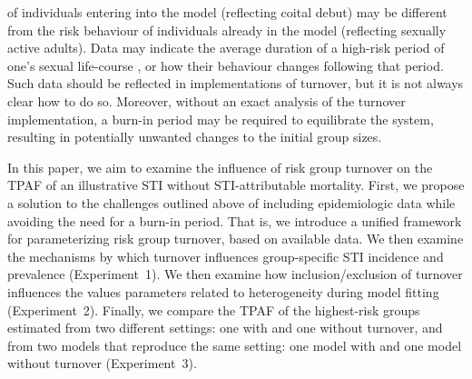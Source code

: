 of individuals entering into the model (reflecting coital debut)
may be different from the risk behaviour
of individuals already in the model (reflecting sexually active adults). %
Data may indicate the average duration
of a high-risk period of one's sexual life-course \citep{Watts2010}, %
or how their behaviour changes following that period. %
Such data should be reflected in implementations of turnover,
but it is not always clear how to do so.
Moreover, without an exact analysis of the turnover implementation,
a burn-in period may be required to equilibrate the system,
resulting in potentially unwanted changes to the initial group sizes.
\par
In this paper, we aim to examine the influence of risk group turnover
on the TPAF of an illustrative STI without STI-attributable mortality.
First, we propose a solution to the challenges outlined above
of including epidemiologic data while avoiding the need for a burn-in period.
That is, we introduce a unified framework for
parameterizing risk group turnover, based on available data.
We then examine the mechanisms by which turnover
influences group-specific STI incidence and prevalence
(Experiment~1).
We then examine how inclusion/exclusion of turnover influences
the values parameters related to heterogeneity during model fitting
(Experiment~2).
Finally, we compare the TPAF of the highest-risk groups estimated
from two different settings: one with and one without turnover,
and from two models that reproduce the same setting:
one model with and one model without turnover
(Experiment~3).